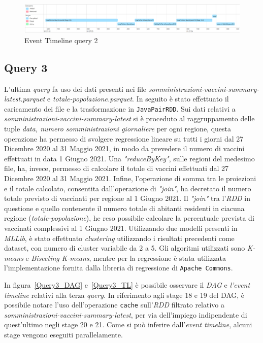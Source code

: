 \documentclass[conference]{IEEEtran}
\begin{document}
\begin{figure}[htbp]
\includegraphics[scale=0.135]{Screenshot/Query2_timeline.png}
\caption{Event Timeline query 2}\label{Query2_TL}
\label{fig}
\end{figure}

\subsection*{\textbf{Query 3}}
L'ultima \emph{query} fa uso dei dati presenti nei file \textit{somministrazioni-vaccini-summary-latest.parquet} e \textit{totale-popolazione.parquet}. In seguito \`{e} stato effettuato il caricamento dei file e la trasformazione in \texttt{JavaPairRDD}. Sui dati relativi a \textit{somministrazioni-vaccini-summary-latest} si \`{e} proceduto al raggruppamento delle tuple \emph{data, numero somministrazioni giornaliere} per ogni regione, questa operazione ha permesso di svolgere regressione lineare su tutti i giorni dal 27 Dicembre 2020 al 31 Maggio 2021, in modo da prevedere il numero di vaccini effettuati in data 1 Giugno 2021. Una \emph{"reduceByKey"}, sulle regioni del medesimo file, ha, invece, permesso di calcolare il totale di vaccini effettuati dal 27 Dicembre 2020 al 31 Maggio 2021. Infine, l'operazione di somma tra le proiezioni e il totale calcolato, consentita dall'operazione di \emph{"join"}, ha decretato il numero totale previsto di vaccinati per regione al 1 Giugno 2021. Il \emph{"join"} tra l'\emph{RDD} in questione e quello contenente il numero totale di abitanti residenti in ciacuna regione (\textit{totale-popolazione}), he reso possibile calcolare la percentuale prevista di vaccinati complessivi al 1 Giugno 2021. Utilizzando due modelli presenti in \emph{MLLib}, \`{e} stato effettuato \emph{clustering} utilizzando i risultati precedenti come dataset, con numero di cluster variabile da 2 a 5. Gli algoritmi utilizzati sono \emph{K-means} e \emph{Bisecting K-means}, mentre per la regressione \`{e} stata utilizzata l'implementazione fornita dalla libreria di regressione di \texttt{Apache Commons}.
\par In figura~\ref{Query3_DAG} e~\ref{Query3_TL} \`{e} possibile osservare il \emph{DAG} e \emph{l'event timeline} relativi alla terza \emph{query}. In riferimento agli stage 18 e 19 del DAG, \`{e} possibile notare l'uso dell'operazione \texttt{cache} sull'\emph{RDD} filtrato relativo a \textit{somministrazioni-vaccini-summary-latest}, per via dell'impiego indipendente di quest'ultimo negli stage 20 e 21. Come si pu\`{o} inferire dall'\emph{event timeline}, alcuni stage vengono eseguiti parallelamente.  
\end{document}
